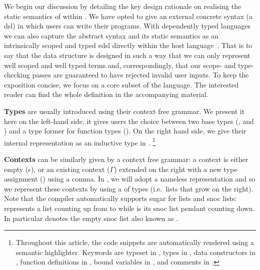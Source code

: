We begin our discussion by detailing the key design rationale on
realising the static semantics of \Velo{} within \Idris{}.
%
We have opted to give \Velo{} an external concrete syntax (a \ac{dsl})
in which users can write their programs.
%
With dependently typed languages we can also capture
the abstract syntax and its static semantics as an intrinsically
scoped and typed \ac{edsl}
directly within the host language~\cite{Augustsson1999edt}.
%
That is to say that the data structure is designed in such a way that
we can only represent well scoped and well typed terms and, correspondingly,
that our scope- and type- checking passes are guaranteed to have rejected
invalid user inputs.
%
To keep the exposition concise, we focus on a core subset of the
language. The interested reader can find the whole definition
in the accompanying material.

\textbf{Types} are usually introduced using their context free grammar.
%
We present it here on the left-hand side, it gives users the choice between
two base types (\TyNat, and \TyBool) and a type former for function types
(\TyFunc{\cdot}{\cdot}).
%
On the right hand side, we give their internal representation as an inductive
type in \Idris{}.%
\footnote{
Throughout this article, the \Idris{} code snippets are
automatically rendered using a semantic highlighter.
%
Keywords are typeset in ,
types in ,
data constructors in ,
function definitions in ,
bound variables in ,
and comments in .
}

\begin{centertight}
\begin{minipage}{0.45\textwidth}
\syntaxtypes
\end{minipage}\hfill
\begin{minipage}{0.45\textwidth}
\end{minipage}
\end{centertight}

\textbf{Contexts} can be similarly given by a context free grammar:
a context is either empty ($\epsilon$), or an existing context ($\Gamma$)
extended on the right with a new type assignment () using a comma.
%
In \Idris{}, we will adopt a nameless representation and so we represent
these contexts by using a  of types
(i.e.\ lists that grow on the right).
%
Note that the \Idris{} compiler automatically supports sugar for lists and
snoc lists: \IdrisData{[1,2,3]} represents a list counting up from
 to  while \IdrisData{[<1,2,3]} is its snoc list
pendant counting down.
%
In particular \IdrisData{[<]} denotes the empty snoc list also known as .


